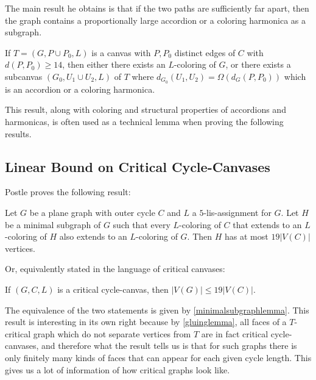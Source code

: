 The main result he obtains is that if the two paths are sufficiently far apart, then the graph contains a proportionally large accordion or a coloring harmonica as a subgraph.

\begin{theorem}
\label{bottlenecktheorem}
If $T = (G, P \cup P_0 , L)$ is a canvas with $P, P_0$ distinct edges of $C$ with $d(P, P_0) \geq 14$, then either there exists an $L$-coloring of $G$, or there exists a subcanvas $(G_0 , U_1 \cup U_2 , L)$ of $T$ where $d_{G_0} (U_1, U_2) = \Omega(d_G (P, P_0))$ which is an accordion or a coloring harmonica.
\end{theorem}

This result, along with coloring and structural properties of accordions and harmonicas, is often used as a technical lemma when proving the following results.

\subsection{Linear Bound on Critical Cycle-Canvases}

Postle proves the following result:

\begin{theorem}
\label{linearboundcycletheorem}
Let $G$ be a plane graph with outer cycle $C$ and $L$ a $5$-lis-assignment for $G$. Let $H$ be a minimal subgraph of $G$ such that every $L$-coloring of $C$ that extends to an $L$-coloring of $H$ also extends to an $L$-coloring of $G$. Then $H$ has at most $19|V(C)|$ vertices.
\end{theorem}

Or, equivalently stated in the language of critical canvases:

\begin{theorem}
If $(G, C, L)$ is a critical cycle-canvas, then $|V(G)| \leq 19 |V(C)|$.
\end{theorem}

The equivalence of the two statements is given by \ref{minimalsubgraphlemma}. This result is interesting in its own right because by \ref{gluinglemma}, all faces of a $T$-critical graph which do not separate vertices from $T$ are in fact critical cycle-canvases, and therefore what the result tells us is that for such graphs there is only finitely many kinds of faces that can appear for each given cycle length. This gives us a lot of information of how critical graphs look like. 

